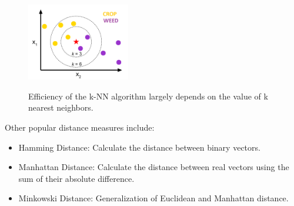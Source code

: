 \documentclass[12pt]{article}
\numberwithin{equation}{section}
\numberwithin{table}{section}
\numberwithin{figure}{section}
\begin{document}
\begin{figure}[H] \centering
	\caption{ Efficiency of the k-NN algorithm largely depends on the value of k nearest neighbors. }
	\includegraphics[width=0.4\textwidth]{r_knn_concept.png}
	\label{knnn}
\end{figure}

\noindent
Other popular distance measures include:

\begin{itemize}
	\item Hamming Distance: Calculate the distance between binary vectors.
	\item Manhattan Distance: Calculate the distance between real vectors using the sum of their absolute difference.
	\item Minkowski Distance: Generalization of Euclidean and Manhattan distance.
\end{itemize}





\end{document}
